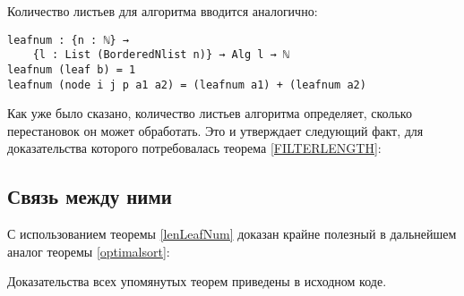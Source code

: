 Количество листьев для алгоритма вводится аналогично:

\begin{verbatim}
leafnum : {n : ℕ} →
    {l : List (BorderedNlist n)} → Alg l → ℕ
leafnum (leaf b) = 1
leafnum (node i j p a1 a2) = (leafnum a1) + (leafnum a2)
\end{verbatim}

Как уже было сказано, количество листьев алгоритма определяет, сколько перестановок он может обработать. Это и утверждает следующий факт, для доказательства которого потребовалась теорема \ref{FILTERLENGTH}:


\subsection
[Связь между сложностью алгоритма и длиной его списка]
{Связь между ними}

С использованием теоремы \ref{lenLeafNum} доказан крайне полезный в дальнейшем аналог теоремы \ref{optimalsort}:


Доказательства всех упомянутых теорем приведены в исходном коде.